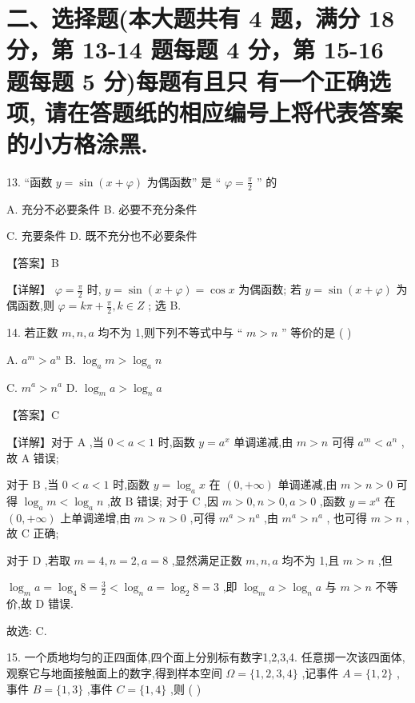\documentclass[10pt]{article}
\begin{document}
\section*{二、选择题(本大题共有 4 题，满分 18 分，第 13-14 题每题 4 分，第 15-16 题每题 5 分)每题有且只 有一个正确选项, 请在答题纸的相应编号上将代表答案的小方格涂黑.}

13. “函数 \(y = \sin \left( {x + \varphi }\right)\) 为偶函数” 是 “ \(\varphi  = \frac{\pi }{2}\) ” 的

A. 充分不必要条件 B. 必要不充分条件

C. 充要条件 D. 既不充分也不必要条件

【答案】B

【详解】 \(\varphi  = \frac{\pi }{2}\) 时, \(y = \sin \left( {x + \varphi }\right)  = \cos x\) 为偶函数; 若 \(y = \sin \left( {x + \varphi }\right)\) 为偶函数,则 \(\varphi  = {k\pi } + \frac{\pi }{2},k \in  Z\) ; 选 B.

14. 若正数 \(m,n,a\) 均不为 1,则下列不等式中与 “ \(m > n\) ” 等价的是 ( )

A. \({a}^{m} > {a}^{n}\) B. \({\log }_{a}m > {\log }_{a}n\)

C. \({m}^{a} > {n}^{a}\) D. \({\log }_{m}a > {\log }_{n}a\)

【答案】C

【详解】对于 \(\mathrm{A}\) ,当 \(0 < a < 1\) 时,函数 \(y = {a}^{x}\) 单调递减,由 \(m > n\) 可得 \({a}^{m} < {a}^{n}\) ,故 \(\mathrm{A}\) 错误;

对于 \(\mathrm{B}\) ,当 \(0 < a < 1\) 时,函数 \(y = {\log }_{a}x\) 在 \(\left( {0, + \infty }\right)\) 单调递减,由 \(m > n > 0\) 可得 \({\log }_{a}m < {\log }_{a}n\) ,故 \(\mathrm{B}\) 错误; 对于 \(\mathrm{C}\) ,因 \(m > 0,n > 0,a > 0\) ,函数 \(y = {x}^{a}\) 在 \(\left( {0, + \infty }\right)\) 上单调递增,由 \(m > n > 0\) ,可得 \({m}^{a} > {n}^{a}\) ,由 \({m}^{a} > {n}^{a}\) , 也可得 \(m > n\) ,故 \(\mathrm{C}\) 正确;

对于 \(\mathrm{D}\) ,若取 \(m = 4,n = 2,a = 8\) ,显然满足正数 \(m,n,a\) 均不为 1,且 \(m > n\) ,但

\({\log }_{m}a = {\log }_{4}8 = \frac{3}{2} < {\log }_{n}a = {\log }_{2}8 = 3\) ,即 \({\log }_{m}a > {\log }_{n}a\) 与 \(m > n\) 不等价,故 \(\mathrm{D}\) 错误.

故选: C.

15. 一个质地均匀的正四面体,四个面上分别标有数字1,2,3,4. 任意掷一次该四面体,观察它与地面接触面上的数字,得到样本空间 \(\Omega  = \{ 1,2,3,4\}\) ,记事件 \(A = \{ 1,2\}\) ,事件 \(B = \{ 1,3\}\) ,事件 \(C = \{ 1,4\}\) ,则 ( )
\end{document}
